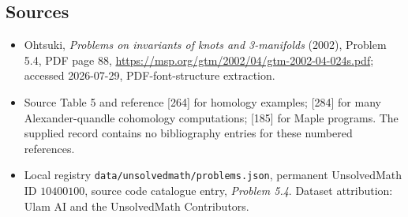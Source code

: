 \documentclass[11pt]{article}
\begin{document}
\subsection{Sources}
\begin{itemize}
\item Ohtsuki, \emph{Problems on invariants of knots and 3-manifolds} (2002), Problem 5.4, PDF page 88, \url{https://msp.org/gtm/2002/04/gtm-2002-04-024s.pdf}; accessed 2026-07-29, PDF-font-structure extraction.
\item Source Table 5 and reference [264] for homology examples; [284] for many Alexander-quandle cohomology computations; [185] for Maple programs. The supplied record contains no bibliography entries for these numbered references.
\item Local registry \texttt{data/unsolvedmath/problems.json}, permanent UnsolvedMath ID $10400100$, source code catalogue entry, \emph{Problem 5.4}. Dataset attribution: Ulam AI and the UnsolvedMath Contributors.
\end{itemize}
\end{document}
